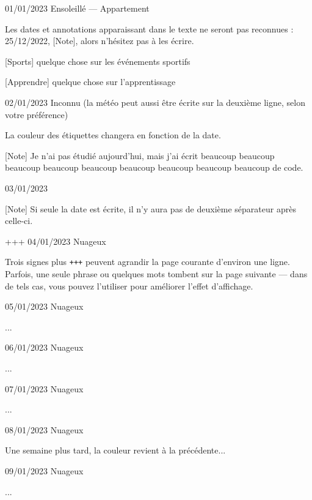 \documentclass[11pt, paperstyle=light yellow, color entry, day-month-year]{jwjournal}
\begin{document}
01/01/2023 Ensoleillé --- Appartement

  Les dates et annotations apparaissant dans le texte ne seront pas reconnues : 25/12/2022, [Note], alors n'hésitez pas à les écrire.

  [Sports] quelque chose sur les événements sportifs

  [Apprendre] quelque chose sur l'apprentissage



02/01/2023
Inconnu (la météo peut aussi être écrite sur la deuxième ligne, selon votre préférence)

  La couleur des étiquettes changera en fonction de la date.

  [Note] Je n'ai pas étudié aujourd'hui, mais j'ai écrit beaucoup beaucoup beaucoup beaucoup beaucoup beaucoup beaucoup beaucoup beaucoup de code.



03/01/2023

  [Note] Si seule la date est écrite, il n'y aura pas de deuxième séparateur après celle-ci.


+++
04/01/2023  Nuageux

  Trois signes plus \texttt{+++} peuvent agrandir la page courante d'environ une ligne. Parfois, une seule phrase ou quelques mots tombent sur la page suivante --- dans de tels cas, vous pouvez l'utiliser pour améliorer l'effet d'affichage.



05/01/2023  Nuageux

  ...



06/01/2023  Nuageux

  ...



07/01/2023  Nuageux

  ...



08/01/2023  Nuageux

  Une semaine plus tard, la couleur revient à la précédente...



09/01/2023  Nuageux

  ...
\end{document}
